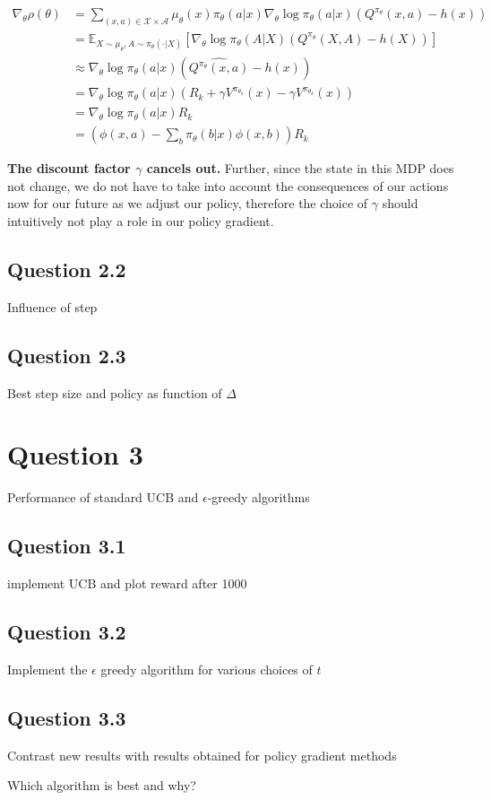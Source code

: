 \documentclass[a4paper, 11pt]{article} %
\begin{document}
\begin{align} \nabla_{\theta} \rho(\theta) 
&=\sum_{(x, a) \in \mathcal{X} \times \mathcal{A}} \mu_{\theta}(x) \pi_{\theta}(a | x) \nabla_{\theta} \log \pi_{\theta}(a | x)\left(Q^{\pi_\theta}(x, a)-h(x)\right) \\
&=\mathbb{E}_{X \sim \mu_{\theta}, A \sim \pi_{\theta}(\cdot | X)}\left[\nabla_{\theta} \log \pi_{\theta}(A | X)\left(Q^{\pi_{\theta}}(X, A)-h(X)\right)\right] \\
&\approx \nabla_{\theta} \log \pi_{\theta}(a | x)  \left(\widehat{Q^{\pi_{\theta}}(x, a)}-h(x)\right) \\
&=\nabla_{\theta} \log \pi_{\theta}(a | x)  \left(R_{k}+\gamma V^{\pi_{\theta_{k}}}(x) - \gamma V^{\pi_{\theta_{k}}}(x)\right) \\
&=\nabla_{\theta} \log \pi_{\theta}(a | x)  R_{k} \\
&=\left(  \phi(x, a)-\sum_{b} \pi_{\theta}(b|x) \phi(x, b)\right)R_{k} 
\end{align}

\textbf{The discount factor $\gamma$ cancels out.} Further, since the state in this MDP does not change, we do not have to take into account the consequences of our actions now for our future as we adjust our policy, therefore the choice of  $\gamma$ should intuitively not play a role in our policy gradient.

\subsection*{Question 2.2}

Influence of step 

\subsection*{Question 2.3}

Best step size and policy as function of $\Delta$

\section*{Question 3}

Performance of standard UCB and $\epsilon$-greedy algorithms 

\subsection*{Question 3.1}

implement UCB and plot reward after 1000

\subsection*{Question 3.2}

Implement the $\epsilon$ greedy algorithm for various choices of $t$

\subsection*{Question 3.3}

Contrast new results with results obtained for policy gradient methods

Which algorithm is best and why?
\end{document}
